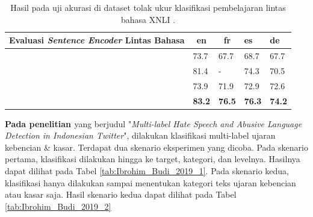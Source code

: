 \begin{table}[]
    \centering
    \caption{Hasil pada uji akurasi di dataset tolak ukur klasifikasi pembelajaran lintas bahasa XNLI \parencite{LampleConneau2019}.}
    \begin{tabular}{|l|l|l|l|l|}
    \hline
    \multicolumn{1}{|c|}{\textbf{Evaluasi \textit{Sentence Encoder} Lintas Bahasa}} & \multicolumn{1}{c|}{\textbf{en}} & \multicolumn{1}{c|}{\textbf{fr}} & \textbf{es}   & \textbf{de}   \\ \hline
    \parencite{LamplePhrase2018}                            & 73.7                             & 67.7                             & 68.7          & 67.7          \\ \hline
    \parencite{Devlin_Chang_Lee_Toutanova_2019}         & 81.4                             & -                                & 74.3          & 70.5          \\ \hline
    \parencite{Artetxe_Schwenk_2019}                      & 73.9                             & 71.9                             & 72.9          & 72.6          \\ \hline
    \parencite{LampleConneau2019}                           & \textbf{83.2}                    & \textbf{76.5}                    & \textbf{76.3} & \textbf{74.2} \\ \hline
    \end{tabular}
    \label{tab:LampleConneau2019}
\end{table}

\textbf{Pada penelitian \parencite{Ibrohim_Budi_2019}} yang berjudul "\textit{Multi-label Hate Speech and Abusive Language Detection in Indonesian Twitter}", dilakukan klasifikasi multi-label ujaran kebencian \& kasar. Terdapat dua skenario eksperimen yang dicoba. Pada skenario pertama, klasifikasi dilakukan hingga ke target, kategori, dan levelnya. Hasilnya dapat dilihat pada Tabel \ref{tab:Ibrohim_Budi_2019_1}. Pada skenario kedua, klasifikasi hanya dilakukan sampai menentukan kategori teks ujaran kebencian atau kasar saja. Hasil skenario kedua dapat dilihat pada Tabel \ref{tab:Ibrohim_Budi_2019_2}

